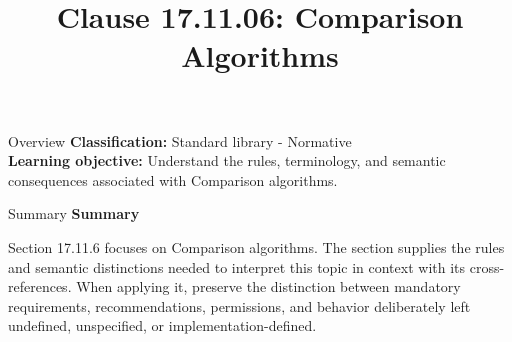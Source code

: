 \documentclass[10pt,letterpaper]{article}
\title{Clause 17.11.06: Comparison Algorithms}
\author{}
\date{}
\begin{document}
\maketitle
\begin{CornellOverviewBox}{Overview}
\textbf{Classification:} Standard library - Normative\\[2pt]
\textbf{Learning objective:} Understand the rules, terminology, and semantic consequences associated with Comparison algorithms.
\end{CornellOverviewBox}\begin{CornellSummaryBox}{Summary}
{\sffamily\bfseries\color{Accent} Summary}\par\vspace{3pt}Section 17.11.6 focuses on Comparison algorithms. The section supplies the rules and semantic distinctions needed to interpret this topic in context with its cross-references. When applying it, preserve the distinction between mandatory requirements, recommendations, permissions, and behavior deliberately left undefined, unspecified, or implementation-defined.
\end{CornellSummaryBox}
\end{document}
